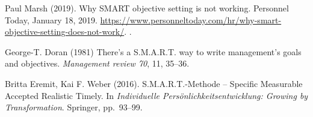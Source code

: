 \documentclass[11pt,a4paper]{article}
\begin{document}
\begin{thebibliography}{xxx}
 Paul Marsh (2019). Why SMART objective setting
  is not working.  Personnel Today, January 18, 2019.  \newblock
  \url{https://www.personneltoday.com/hr/why-smart-objective-setting-does-not-work/}.
  .

 George-T. Doran (1981) \newblock There’s a S.M.A.R.T.
  way to write management’s goals and objectives.  \newblock \emph{Management
    review 70}, 11, 35--36.

 Britta Eremit, Kai F. Weber (2016).  \newblock
  S.M.A.R.T.-Methode – Specific Measurable Accepted Realistic Timely.
  \newblock In \emph{Individuelle Pers{\"o}nlichkeitsentwicklung: Growing by
    Transformation}.  Springer, pp.~93--99.

\end{thebibliography}
\end{document}
